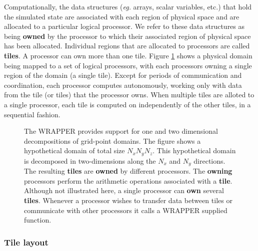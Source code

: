 Computationally, the data structures (\textit{eg.} arrays, scalar
variables, etc.) that hold the simulated state are associated with
each region of physical space and are allocated to a particular
logical processor.  We refer to these data structures as being {\bf
  owned} by the processor to which their associated region of physical
space has been allocated.  Individual regions that are allocated to
processors are called {\bf tiles}.  A processor can own more than one
tile.  Figure \ref{fig:domaindecomp} shows a physical domain being
mapped to a set of logical processors, with each processors owning a
single region of the domain (a single tile).  Except for periods of
communication and coordination, each processor computes autonomously,
working only with data from the tile (or tiles) that the processor
owns.  When multiple tiles are alloted to a single processor, each
tile is computed on independently of the other tiles, in a sequential
fashion.

\begin{figure}
\begin{center}
\end{center}
\caption{ The WRAPPER provides support for one and two dimensional
  decompositions of grid-point domains. The figure shows a
  hypothetical domain of total size $N_{x}N_{y}N_{z}$. This
  hypothetical domain is decomposed in two-dimensions along the
  $N_{x}$ and $N_{y}$ directions. The resulting {\bf tiles} are {\bf
    owned} by different processors. The {\bf owning} processors
  perform the arithmetic operations associated with a {\bf tile}.
  Although not illustrated here, a single processor can {\bf own}
  several {\bf tiles}.  Whenever a processor wishes to transfer data
  between tiles or communicate with other processors it calls a
  WRAPPER supplied function.  } \label{fig:domaindecomp}
\end{figure}


\subsubsection{Tile layout}

